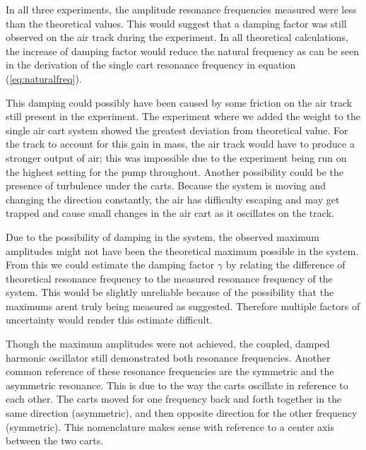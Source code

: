 \par In all three experiments, the amplitude resonance frequencies measured were less than the theoretical values. This would suggest that a damping factor was still observed on the air track during the experiment. In all theoretical calculations, the increase of damping factor would reduce the natural frequency as can be seen in the derivation of the single cart resonance frequency in equation (\ref{eq:naturalfreq}).

\par This damping could possibly have been caused by some friction on the air track still present in the experiment. The experiment where we added the weight to the single air cart system showed the greatest deviation from theoretical value. For the track to account for this gain in mass, the air track would have to produce a stronger output of air; this was impossible due to the experiment being run on the highest setting for the pump throughout. Another possibility could be the presence of turbulence under the carts. Because the system is moving and changing the direction constantly, the air has difficulty escaping and may get trapped and cause small changes in the air cart as it oscillates on the track. 

\par Due to the possibility of damping in the system, the observed maximum amplitudes might not have been the theoretical maximum possible in the system. From this we could estimate the damping factor $\gamma$ by relating the difference of theoretical resonance frequency to the measured resonance frequency of the system. This would be slightly unreliable because of the possibility that the maximums arent truly being measured as suggested. Therefore multiple factors of uncertainty would render this estimate difficult.

\par Though the maximum amplitudes were not achieved, the coupled, damped harmonic oscillator still demonstrated both resonance frequencies. Another common reference of these resonance frequencies are the symmetric and the asymmetric resonance. This is due to the way the carts oscillate in reference to each other. The carts moved for one frequency back and forth together in the same direction (asymmetric), and then opposite direction for the other frequency (symmetric). This nomenclature makes sense with reference to a center axis between the two carts.